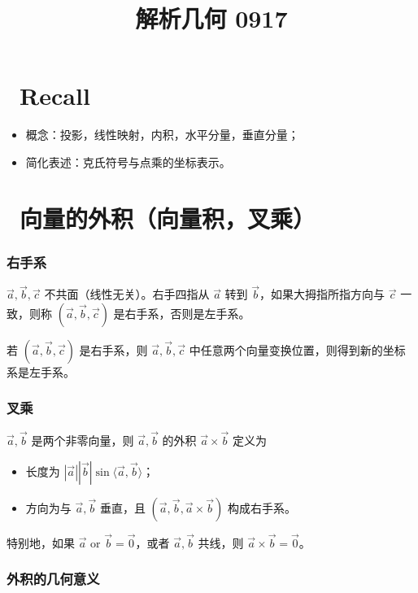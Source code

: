\documentclass[UTF8,11pt]{ctexart}
\title{解析几何 0917}
\date{}
\theoremstyle{cnthm}
\begin{document}
\maketitle

\section{\ Recall}

\begin{itemize}
\item 概念：投影，线性映射，内积，水平分量，垂直分量；
\item 简化表述：克氏符号与点乘的坐标表示。
\end{itemize}

\section{\ 向量的外积（向量积，叉乘）}

\subsubsection*{右手系}

$\vec a,\vec b,\vec c$ 不共面（线性无关）。右手四指从 $\vec a$
转到 $\vec b$，如果大拇指所指方向与 $\vec c$ 一致，则称
$(\vec a,\vec b,\vec c)$ 是右手系，否则是左手系。

若 $(\vec a,\vec b,\vec c)$ 是右手系，则 $\vec a,\vec b,\vec c$
中任意两个向量变换位置，则得到新的坐标系是左手系。

\subsubsection*{叉乘}

$\vec a,\vec b$ 是两个非零向量，则 $\vec a,\vec b$ 的外积
$\vec a\times\vec b$ 定义为

\begin{itemize}
\item 长度为 $|\vec a||\vec b|\sin\langle\vec a,\vec b\rangle$；
\item 方向为与 $\vec a,\vec b$ 垂直，且
$(\vec a,\vec b,\vec a\times\vec b)$ 构成右手系。
\end{itemize}

特别地，如果 $\vec a$ or $\vec b=\vec 0$，或者
$\vec a,\vec b$ 共线，则 $\vec a\times\vec b=\vec 0$。

\subsubsection*{外积的几何意义}
\end{document}
